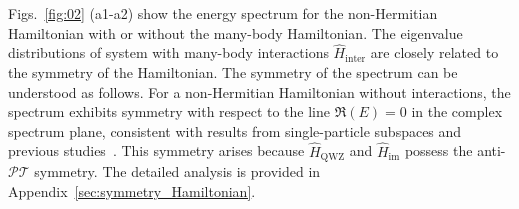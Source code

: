 \documentclass[longbibliography, aps, prx, amsmath, amssymb, amsfonts, twocolumn,superscriptaddress, footinbib]{revtex4-1}
\begin{document}
	Figs.~\ref{fig:02} (a1-a2) show the energy spectrum
	for the non-Hermitian Hamiltonian with or without the many-body Hamiltonian. 
	The eigenvalue distributions of system with many-body interactions $\hat{H}_{\text{inter}}$ are closely related to the symmetry of the Hamiltonian. The 
	symmetry of the spectrum can be understood as follows. For a non-Hermitian Hamiltonian without interactions, the spectrum exhibits symmetry with respect to the line $\Re(E)=0$ in the complex spectrum plane, consistent with results from single-particle subspaces and previous studies~\cite{nakamura2023universal, ma2024non,schindler2023hermitian}. 
	This symmetry arises because $\hat{H}_{\text{QWZ}}$ and $\hat{H}_{\text{im}}$ possess the anti-$\mathcal{PT}$ symmetry.
	The detailed analysis is provided in Appendix~\ref{sec:symmetry_Hamiltonian}.
\end{document}
